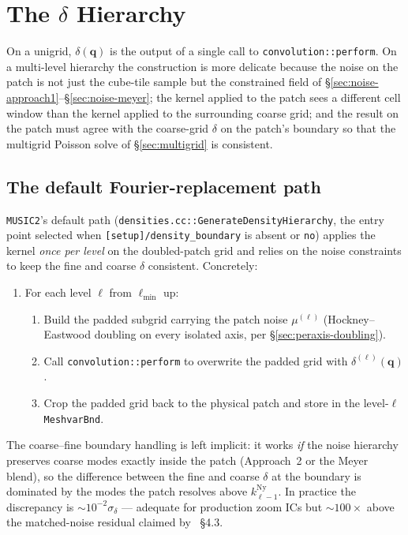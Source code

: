 \documentclass[12pt]{article}
\newcommand{\bq}{\mathbf{q}}
\newcommand{\code}[1]{\texttt{#1}}
\begin{document}
\section{The $\delta$ Hierarchy}
\label{sec:delta-hierarchy}

On a unigrid, $\delta(\bq)$ is the output of a single call to
\code{convolution::perform}.  On a multi-level hierarchy the
construction is more delicate because the noise on the patch is not
just the cube-tile sample but the constrained field of
\S\ref{sec:noise-approach1}--\S\ref{sec:noise-meyer}; the kernel
applied to the patch sees a different cell window than the kernel
applied to the surrounding coarse grid; and the result on the patch
must agree with the coarse-grid $\delta$ on the patch's boundary so
that the multigrid Poisson solve of \S\ref{sec:multigrid} is
consistent.

\subsection{The default Fourier-replacement path}
\label{sec:delta-default}

\code{MUSIC2}'s default path (\code{densities.cc::GenerateDensityHierarchy},
the entry point selected when \code{[setup]/density\_boundary} is
absent or \code{no}) applies the kernel \emph{once per level} on
the doubled-patch grid and relies on the noise constraints to keep
the fine and coarse $\delta$ consistent.  Concretely:
\begin{enumerate}
  \item For each level $\ell$ from $\ell_\mathrm{min}$ up:
        \begin{enumerate}
          \item Build the padded subgrid carrying the patch noise
                $\mu^{(\ell)}$ (Hockney--Eastwood doubling on every
                isolated axis, per \S\ref{sec:peraxis-doubling}).
          \item Call \code{convolution::perform} to overwrite the
                padded grid with $\delta^{(\ell)}(\bq)$.
          \item Crop the padded grid back to the physical patch and
                store in the level-$\ell$ \code{MeshvarBnd}.
        \end{enumerate}
\end{enumerate}
The coarse--fine boundary handling is left implicit: it works
\emph{if} the noise hierarchy preserves coarse modes exactly inside
the patch (Approach~2 or the Meyer blend), so the difference
between the fine and coarse $\delta$ at the boundary is dominated by
the modes the patch resolves above $k^\mathrm{Ny}_{\ell-1}$.  In
practice the discrepancy is $\sim 10^{-2}\sigma_\delta$ ---
adequate for production zoom ICs but $\sim 100\times$ above the
matched-noise residual claimed by \citet{Hahn2011}~\S4.3.
\end{document}
